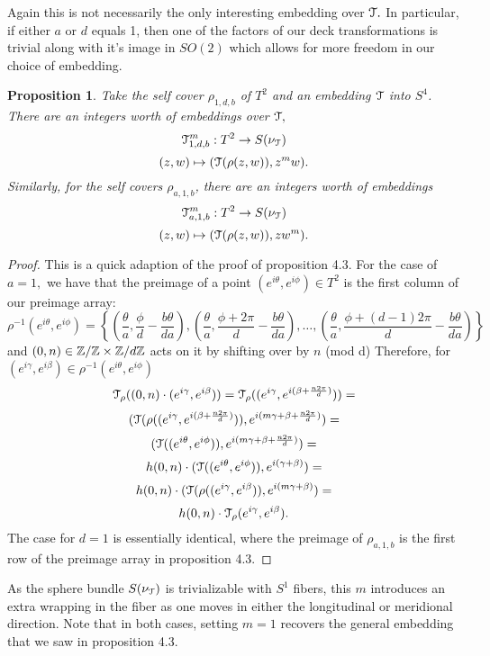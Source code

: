 \documentclass[a4paper, 12 pt, reqno]{amsart}
\newtheorem{prop}[theorem]{Proposition}
\theoremstyle{definition}
\theoremstyle{remark}
\begin{document}
Again this is not necessarily the only interesting embedding over $\mathcal T.$ In particular, if either $a$ or $d$ equals 1, then one of the factors of our deck transformations is trivial along with it's image in $SO(2)$ which allows for more freedom in our choice of embedding. 

\begin{prop}
Take the self cover $\rho_{1, d, b}$ of $T^{2}$ and an embedding $\mathcal T$ into $S^{4}$. There are an integers worth of embeddings over $\mathcal T,$ $$\mathcal T_{1, d, b}^{m}: T^{2} \rightarrow S(\nu_{\mathcal T})$$ $$(z, w) \mapsto (\mathcal T(\rho(z, w)), z^{m}w).$$  Similarly, for the self covers $\rho_{a, 1, b}$, there are an integers worth of embeddings $$\mathcal T_{a, 1, b}^{m}: T^{2} \rightarrow S(\nu_{\mathcal T})$$ $$(z, w) \mapsto (\mathcal T(\rho(z, w)), zw^{m}).$$
\end{prop}

\begin{proof}
This is a quick adaption of the proof of proposition 4.3. For the case of $a = 1,$ we have that the preimage of a point $(e^{i\theta}, e^{i\phi}) \in T^{2}$ is the first column of our preimage array: $$\rho^{-1}(e^{i\theta}, e^{i\phi}) = \left\{(\frac{\theta}{a} , \frac{\phi}{d} - \frac{b\theta}{da}), (\frac{\theta}{a}, \frac{\phi + 2\pi}{d} - \frac{b\theta}{da}), \hdots, (\frac{\theta}{a}, \frac{\phi + (d - 1)2\pi}{d} - \frac{b\theta}{da}) \right\}$$ and $(0, n) \in \mathbb Z/\mathbb Z \times \mathbb Z/d\mathbb Z$ acts on it by shifting over by $n$ (mod d) Therefore, for $(e^{i\gamma}, e^{i\beta}) \in \rho^{-1}(e^{i\theta}, e^{i\phi}) $$$\mathcal T_{\rho}((0, n) \cdot (e^{i\gamma}, e^{i\beta})) = \mathcal T_{\rho}((e^{i\gamma}, e^{i(\beta + \frac{n2\pi}{d})})) = $$
$$(\mathcal T(\rho((e^{i\gamma}, e^{i(\beta + \frac{n2\pi}{d})})), e^{i(m\gamma + \beta + \frac{n2\pi}{d})}) = $$ 
$$(\mathcal T((e^{i\theta}, e^{i\phi})), e^{i(m\gamma + \beta + \frac{n2\pi}{d})}) = $$
$$h(0,n) \cdot (\mathcal T((e^{i\theta}, e^{i\phi})), e^{i(\gamma + \beta)})  =$$
$$h(0,n) \cdot (\mathcal T(\rho((e^{i\gamma}, e^{i\beta})), e^{i(m\gamma + \beta)})  = $$
$$h(0,n) \cdot \mathcal T_{\rho}(e^{i\gamma}, e^{i\beta}).$$
The case for $d = 1$ is essentially identical, where the preimage of $\rho_{a, 1, b}$ is the first row of the preimage array in proposition 4.3. 
\end{proof}

As the sphere bundle $S(\nu_{\mathcal T})$ is trivializable with $S^{1}$ fibers, this $m$ introduces an extra wrapping in the fiber as one moves in either the longitudinal or meridional direction. Note that in both cases, setting $m = 1$ recovers the general embedding that we saw in proposition 4.3. 
\end{document}
